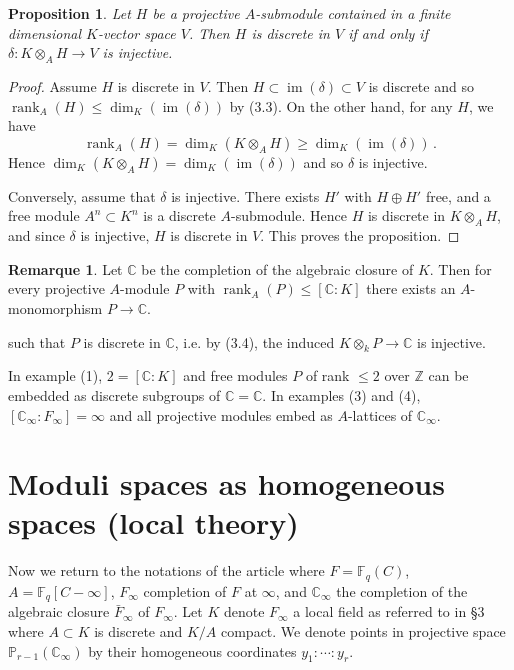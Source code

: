 \documentclass[12pt,a4paper]{article}
\theoremstyle{plain}
\newtheorem{proposition}{Proposition}[section]
\theoremstyle{definition}
\newtheorem{remark}{Remarque}[section]
\theoremstyle{remark}
\DeclareMathOperator{\rank}{rank}
\DeclareMathOperator{\im}{im}
\begin{document}
\begin{proposition}
Let $H$ be a projective $A$-submodule contained in a finite dimensional 
$K$-vector space $V$. Then $H$ is discrete in $V$ if and only if 
$\delta\colon K \otimes_A H \to V$ is injective.
\end{proposition}

\begin{proof}
Assume $H$ is discrete in $V$. Then $H \subset \im(\delta) \subset V$ is 
discrete and so $\rank_A(H) \leqslant \dim_K(\im(\delta))$ by (3.3). On the 
other hand, for any $H$, we have
\[
\rank_A(H) = \dim_K(K \otimes_A H) \geqslant \dim_K(\im(\delta)) \,.
\]
Hence $\dim_K(K \otimes_A H) = \dim_K(\im(\delta))$ and so $\delta$ is 
injective.

Conversely, assume that $\delta$ is injective. There exists $H'$ with 
$H \oplus H'$ free, and a free module $A^n \subset K^n$ is a discrete 
$A$-submodule. Hence $H$ is discrete in $K \otimes_A H$, and since $\delta$ 
is injective, $H$ is discrete in $V$. This proves the proposition.
\end{proof}

\begin{remark}
Let $\mathbb{C}$ be the completion of the algebraic closure of $K$. Then for 
every projective $A$-module $P$ with $\rank_A(P) \leqslant [\mathbb{C} : K]$ 
there exists an $A$-monomorphism $P \to \mathbb{C}$.
\end{remark}

such that $P$ is discrete in $\mathbb{C}$, i.e. by (3.4), the induced 
$K \otimes_k P \to \mathbb{C}$ is injective.

In example (1), $2 = [\mathbb{C} : K]$ and free modules $P$ of rank 
$\leqslant 2$ over $\mathbb{Z}$ can be embedded as discrete subgroups of 
$\mathbb{C} = \mathbb{C}$. In examples (3) and (4), 
$[\mathbb{C}_\infty : F_\infty] = \infty$ and all projective modules embed as 
$A$-lattices of $\mathbb{C}_\infty$.


\section{Moduli spaces as homogeneous spaces (local theory)}

Now we return to the notations of the article where $F = \mathbb{F}_q(C)$, 
$A = \mathbb{F}_q[C - \infty]$, $F_\infty$ completion of $F$ at $\infty$, and 
$\mathbb{C}_\infty$ the completion of the algebraic closure $\bar{F}_\infty$ of 
$F_\infty$. Let $K$ denote $F_\infty$ a local field as referred to in \S 3 
where $A \subset K$ is discrete and $K/A$ compact. We denote points in 
projective space $\mathbb{P}_{r-1}(\mathbb{C}_\infty)$ by their homogeneous 
coordinates $y_1 : \cdots : y_r$.
\end{document}
